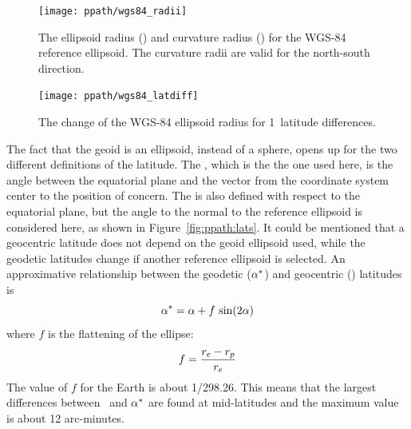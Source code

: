 \begin{figure}[!p]
 \begin{minipage}[c]{0.65\textwidth}
 \texttt{[image: ppath/wgs84\_radii]}
 \end{minipage}%
 \begin{minipage}[c]{0.35\textwidth}
  \caption{The ellipsoid radius (\aRds{\odot}) and curvature radius ()
    for the
    WGS-84 reference ellipsoid. The curvature radii are valid for the
    north-south direction.}
  \label{fig:ppath:wgs84radii}
 \end{minipage}%
\end{figure}   
        
\begin{figure}[!p]
 \begin{minipage}[c]{0.65\textwidth}
 \texttt{[image: ppath/wgs84\_latdiff]}
 \end{minipage}%
 \begin{minipage}[c]{0.35\textwidth}
  \caption{The change of the WGS-84 ellipsoid radius for  1\degree\ 
            latitude differences.}
  \label{fig:ppath:latdiff}
 \end{minipage}%
\end{figure}   



\label{sec:ppath:geolat}

The fact that the geoid is an ellipsoid, instead of a sphere, opens up
for the two different definitions of the latitude. The
, which is the the one used here, is the
angle between the equatorial plane and the vector from the coordinate
system center to the position of concern. The \textindex{geodetic
  latitude} is also defined with respect to the equatorial plane, but
the angle to the normal to the reference ellipsoid is considered here, as
shown in Figure~\ref{fig:ppath:lats}. It could be mentioned that a
geocentric latitude does not depend on the geoid ellipsoid used, while
the geodetic latitudes change if another reference ellipsoid is
selected. An approximative relationship between the geodetic
($\alpha^*$) and geocentric (\Lat) latitudes is \citep{montenbruck:00}
\begin{equation}
 \alpha^* = \alpha + f\,\sin(2\alpha)  
 \label{eq:ppath:lats}
\end{equation}
where $f$ is the flattening of the ellipse:
\begin{equation}
 f = \frac{r_{e}-r_{p}}{r_{e}}
 \label{eq:ppath:flattening}
\end{equation}
The value of $f$ for the Earth is about 1/298.26. This means that the
largest differences between \Lat\ and $\alpha^*$ are found at
mid-latitudes and the maximum value is about 12 arc-minutes.

